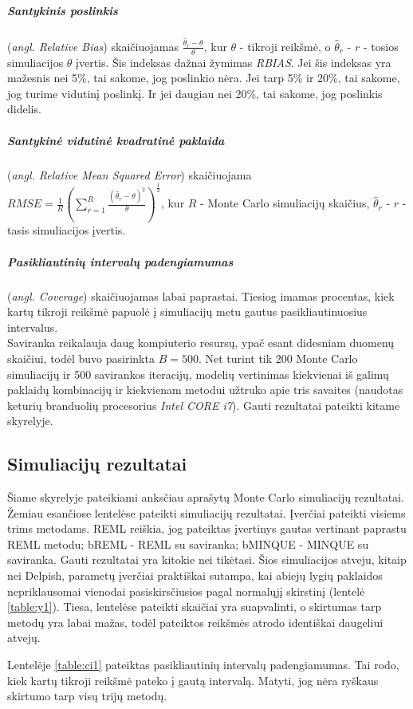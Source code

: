 \documentclass[12pt,a4paper]{article}
\begin{document}
\subparagraph{Santykinis poslinkis} (\textit{angl. Relative Bias}) skaičiuojamas $\frac{\hat{\theta}_r-\theta}{\theta}$, kur $\theta$ - tikroji reikšmė, o $\hat{\theta}_r$ - $r$ - tosios simuliacijos $\theta$ įvertis. Šis indeksas dažnai žymimas \textit{RBIAS}. Jei šis indeksas yra mažesnis nei 5\%, tai sakome, jog poslinkio nėra. Jei tarp 5\% ir 20\%, tai sakome, jog turime vidutinį poslinkį. Ir jei daugiau nei 20\%, tai sakome, jog poslinkis didelis.

\subparagraph{Santykinė vidutinė kvadratinė paklaida} (\textit{angl. Relative Mean Squared Error}) skaičiuojama $RMSE=\frac{1}{R}\left(\sum^R_{r=1}\frac{(\hat{\theta}_r-\theta)^2}{\theta}\right)^\frac{1}{2}$, kur $R$ - Monte Carlo simuliacijų skaičius, $\hat{\theta}_r$ - $r$ - tasis simuliacijos įvertis.

\subparagraph{Pasikliautinių intervalų padengiamumas} (\textit{angl. Coverage}) skaičiuojamas labai paprastai. Tiesiog imamas procentas, kiek kartų tikroji reikšmė papuolė į simuliacijų metu gautus pasikliautinuosius intervalus.\\

\indent Saviranka reikalauja daug kompiuterio resursų, ypač esant didesniam duomenų skaičiui, todėl buvo pasirinkta $B=500$. Net turint tik 200 Monte Carlo simuliacijų ir 500 savirankos iteracijų, modelių vertinimas kiekvienai iš galimų paklaidų kombinacijų ir kiekvienam metodui užtruko apie tris savaites (naudotas keturių branduolių procesorius \textit{Intel CORE i7}). Gauti rezultatai pateikti kitame skyrelyje.

\subsection{Simuliacijų rezultatai}
\indent Šiame skyrelyje pateikiami anksčiau aprašytų Monte Carlo simuliacijų rezultatai. Žemiau esančiose lentelėse pateikti simuliacijų rezultatai. Įverčiai pateikti visiems trims metodams. REML reiškia, jog pateiktas įvertinys gautas vertinant paprastu REML metodu; bREML - REML su saviranka; bMINQUE - MINQUE su saviranka. Gauti rezultatai yra kitokie nei tikėtasi. Šios simuliacijos atveju, kitaip nei Delpish, parametų įverčiai praktiškai sutampa, kai abiejų lygių paklaidos nepriklausomai vienodai pasiskirsčiusios pagal normalųjį skirstinį (lentelė \ref{table:y1}). Tiesa, lentelėse pateikti skaičiai yra suapvalinti, o skirtumas tarp metodų yra labai mažas, todėl pateiktos reikšmės atrodo identiškai daugeliui atvejų. 

\indent Lentelėje \ref{table:ci1} pateiktas pasikliautinių intervalų padengiamumas. Tai rodo, kiek kartų tikroji reikšmė pateko į gautą intervalą. Matyti, jog nėra ryškaus skirtumo tarp visų trijų metodų.
\end{document}
